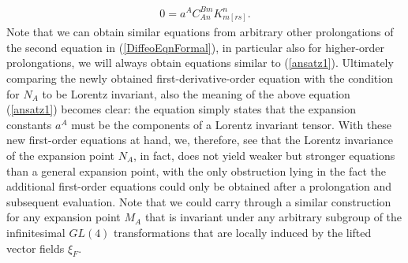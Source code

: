 \begin{align}\label{ansatz1}
    0 = a^A C^{Bm}_{An}  K_{m[rs]}^n.
\end{align}
Note that we can obtain similar equations from arbitrary other prolongations of the second equation in (\ref{DiffeoEqnFormal}), in particular also for higher-order prolongations, we will always obtain equations similar to (\ref{ansatz1}). Ultimately comparing the newly obtained first-derivative-order equation with the condition for $N_A$ to be Lorentz invariant, also the meaning of the above equation (\ref{ansatz1}) becomes clear: the equation simply states that the expansion constants $a^A$ must be the components of a Lorentz invariant tensor. With these new first-order equations at hand, we, therefore, see that the Lorentz invariance of the expansion point $N_A$, in fact, does not yield weaker but stronger equations than a general expansion point, with the only obstruction lying in the fact the additional first-order equations could only be obtained after a prolongation and subsequent evaluation. Note that we could carry through a similar construction for any expansion point $M_A$ that is invariant under any arbitrary subgroup of the infinitesimal $GL(4)$ transformations that are locally induced by the lifted vector fields $\xi_F$. 

